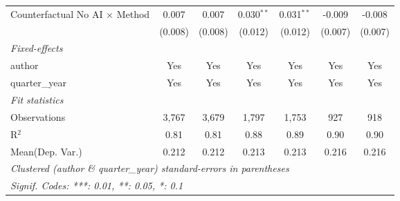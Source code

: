 \begin{tabular}{lcccccc}
   Counterfactual No AI $\times$ Method  & 0.007         & 0.007         & 0.030$^{**}$   & 0.031$^{**}$   & -0.009    & -0.008\\   
                                         & (0.008)       & (0.008)       & (0.012)        & (0.012)        & (0.007)   & (0.007)\\   
   \midrule
   \emph{Fixed-effects}\\
   author                                & Yes           & Yes           & Yes            & Yes            & Yes       & Yes\\  
   quarter\_year                         & Yes           & Yes           & Yes            & Yes            & Yes       & Yes\\  
   \midrule
   \emph{Fit statistics}\\
   Observations                          & 3,767         & 3,679         & 1,797          & 1,753          & 927       & 918\\  
   R$^2$                                 & 0.81          & 0.81          & 0.88           & 0.89           & 0.90      & 0.90\\  
Mean(Dep. Var.) & 0.212 & 0.212 & 0.213 & 0.213 & 0.216 & 0.216 \\
   \midrule \midrule
   \multicolumn{7}{l}{\emph{Clustered (author \& quarter\_year) standard-errors in parentheses}}\\
   \multicolumn{7}{l}{\emph{Signif. Codes: ***: 0.01, **: 0.05, *: 0.1}}\\
\end{tabular}
\par\endgroup
